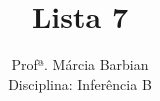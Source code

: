 \documentclass[10pt,brazil,addpoints]{exam}
\begin{document}
\title{Lista 7}


\author{
  Profª. Márcia Barbian \\
  Disciplina: Inferência B\\
  \date{}
}


\maketitle
\end{document}
